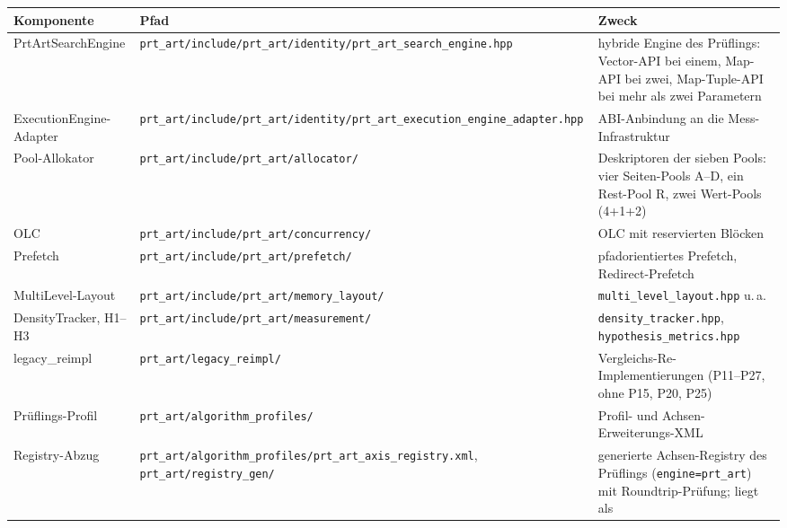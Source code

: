 {\small
\begin{longtable}{@{}>{\raggedright\arraybackslash}p{}>{\raggedright\arraybackslash}p{}>{\raggedright\arraybackslash}p{}@{}}
\toprule
\textbf{Komponente} & \textbf{Pfad} & \textbf{Zweck} \\
\midrule
\endhead%
\midrule
\endfoot%
\bottomrule
\endlastfoot%
PrtArtSearchEngine &
\texttt{prt\_art/\allowbreak{}include/\allowbreak{}prt\_art/\allowbreak{}identity/\allowbreak{}prt\_art\_search\_engine.hpp} &
hybride Engine des Prüflings: Vector-API bei einem, Map-API bei zwei, Map-Tuple-API bei mehr als zwei
Parametern \\
ExecutionEngine-Adapter &
\texttt{prt\_art/\allowbreak{}include/\allowbreak{}prt\_art/\allowbreak{}identity/\allowbreak{}prt\_\allowbreak{}art\_\allowbreak{}execution\_\allowbreak{}engine\_\allowbreak{}adapter.hpp} &
ABI-Anbindung an die Mess-Infrastruktur \\
Pool-Allokator &
\texttt{prt\_art/\allowbreak{}include/\allowbreak{}prt\_art/\allowbreak{}allocator/} &
Deskriptoren der sieben Pools: vier Seiten-Pools A--D, ein Rest-Pool R, zwei Wert-Pools (4+1+2) \\
OLC &
\texttt{prt\_art/\allowbreak{}include/\allowbreak{}prt\_art/\allowbreak{}concurrency/} &
OLC mit reservierten Blöcken \\
Prefetch &
\texttt{prt\_art/\allowbreak{}include/\allowbreak{}prt\_art/\allowbreak{}prefetch/} &
pfadorientiertes Prefetch, Redirect-Prefetch \\
MultiLevel-Layout &
\texttt{prt\_art/\allowbreak{}include/\allowbreak{}prt\_art/\allowbreak{}memory\_layout/} &
\texttt{multi\_\allowbreak{}level\_\allowbreak{}layout.hpp} u.\,a. \\
DensityTracker, H1--H3 &
\texttt{prt\_art/\allowbreak{}include/\allowbreak{}prt\_art/\allowbreak{}measurement/} &
\texttt{density\_\allowbreak{}tracker.hpp}, \texttt{hypothesis\_\allowbreak{}metrics.hpp} \\
legacy\_reimpl &
\texttt{prt\_art/\allowbreak{}legacy\_reimpl/} &
14 Vergleichs-Re-Implementierungen (P11--P27, ohne P15, P20, P25) \\
Prüflings-Profil &
\texttt{prt\_art/\allowbreak{}algorithm\_profiles/} &
Profil- und Achsen-Erweiterungs-XML \\
Registry-Abzug &
\texttt{prt\_art/\allowbreak{}algorithm\_profiles/\allowbreak{}prt\_art\_axis\_registry.xml},
\texttt{prt\_art/\allowbreak{}registry\_gen/} &
generierte Achsen-Registry des Prüflings (\texttt{engine=prt\_art}) mit Roundtrip-Prüfung; liegt als

\end{longtable}}
